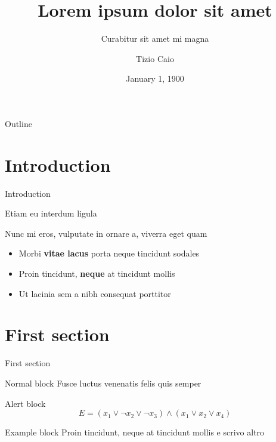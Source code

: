 \documentclass{beamer}
\title{Lorem ipsum dolor sit amet}
\subtitle{Curabitur sit amet mi magna}
\author{Tizio Caio}
\date{January 1, 1900}
\begin{document}
	\maketitle

	\begin{frame}{Outline}
		\tableofcontents
	\end{frame}


	\section{Introduction}

	\begin{frame}{Introduction}

		Etiam eu interdum ligula

		Nunc mi eros, vulputate in ornare a, viverra eget quam \vspace{.5em}

		\begin{itemize}
			\item Morbi \textbf{vitae lacus} porta neque tincidunt sodales \vspace{.5em}
			\item Proin tincidunt, \textbf{neque} at tincidunt mollis \vspace{.5em}
			\item Ut \alert{lacinia sem a nibh} consequat porttitor
		\end{itemize}
	\end{frame}


	\section{First section}

	\begin{frame}{First section}
		\begin{block}{Normal block}
			Fusce luctus venenatis felis quis semper
		\end{block}

		\begin{alertblock}{Alert block}
			$$ E = (x_1 \vee \neg x_2 \vee \neg x_3) \wedge (x_1 \vee x_2 \vee x_4) $$
		\end{alertblock}

		\begin{exampleblock}{Example block}
			Proin tincidunt, neque at tincidunt mollis e scrivo altro
		\end{exampleblock}
	\end{frame}
\end{document}
